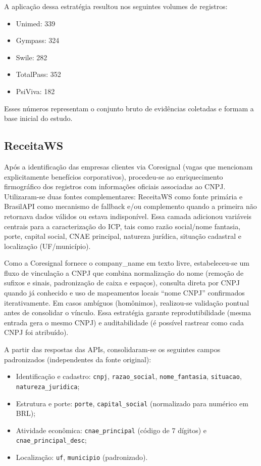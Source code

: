 A aplicação dessa estratégia resultou nos seguintes volumes de registros:

\begin{itemize}
    \item Unimed: 339
    \item Gympass: 324
    \item Swile: 282
    \item TotalPass: 352
    \item PsiViva: 182
\end{itemize}

Esses números representam o conjunto bruto de evidências coletadas e formam a base inicial do estudo.

\subsection{\textbf{ReceitaWS}}

Após a identificação das empresas clientes via Coresignal (vagas que mencionam explicitamente benefícios corporativos), procedeu-se ao enriquecimento firmográfico dos registros com informações oficiais associadas ao CNPJ. Utilizaram-se duas fontes complementares: ReceitaWS como fonte primária e BrasilAPI como mecanismo de fallback e/ou complemento quando a primeira não retornava dados válidos ou estava indisponível. Essa camada adicionou variáveis centrais para a caracterização do ICP, tais como razão social/nome fantasia, porte, capital social, CNAE principal, natureza jurídica, situação cadastral e localização (UF/município).

Como a Coresignal fornece o company\_name em texto livre, estabeleceu-se um fluxo de vinculação a CNPJ que combina normalização do nome (remoção de sufixos e sinais, padronização de caixa e espaços), consulta direta por CNPJ quando já conhecido e uso de mapeamentos locais “nome  CNPJ” confirmados iterativamente. Em casos ambíguos (homônimos), realizou-se validação pontual antes de consolidar o vínculo. Essa estratégia garante reprodutibilidade (mesma entrada gera o mesmo CNPJ) e auditabilidade (é possível rastrear como cada CNPJ foi atribuído).

A partir das respostas das APIs, consolidaram-se os seguintes campos padronizados (independentes da fonte original):

\begin{itemize}
    \item Identificação e cadastro: \texttt{cnpj}, \texttt{razao\_social}, \texttt{nome\_fantasia}, \texttt{situacao}, \texttt{natureza\_juridica};
    \item Estrutura e porte: \texttt{porte}, \texttt{capital\_social} (normalizado para numérico em BRL);
    \item Atividade econômica: \texttt{cnae\_principal} (código de 7 dígitos) e \texttt{cnae\_principal\_desc};
    \item Localização: \texttt{uf}, \texttt{municipio} (padronizado).
\end{itemize}

